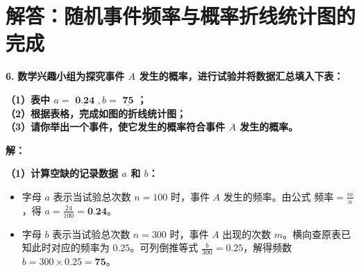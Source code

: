 \section{解答：随机事件频率与概率折线统计图的完成}

\vspace{0.6cm}

\textbf{\LARGE 6.} \textbf{数学兴趣小组为探究事件 $A$ 发生的概率，进行试验并将数据汇总填入下表：}

\vspace{0.3cm}
\begin{center}
\renewcommand{\arraystretch}{1.8}
\end{center}

\vspace{0.4cm}
\textbf{（1）表中 $a = \underline{\textbf{  0.24  }}, b = \underline{\textbf{  75  }}$；\\
（2）根据表格，完成如图的折线统计图；\\
（3）请你举出一个事件，使它发生的概率符合事件 $A$ 发生的概率。}

\vspace{0.4cm}
\textbf{解：}

\textbf{（1）计算空缺的记录数据 $a$ 和 $b$：}
\begin{itemize}
    \item 字母 $a$ 表示当试验总次数 $n=100$ 时，事件 $A$ 发生的频率。由公式 $\text{频率} = \frac{m}{n}$，得 $a = \frac{24}{100} = \textbf{0.24}$。
    \item 字母 $b$ 表示当试验总次数 $n=300$ 时，事件 $A$ 出现的次数 $m$。横向查原表已知此时对应的频率为 $0.25$。可列倒推等式 $\frac{b}{300} = 0.25$，解得频数 $b = 300 \times 0.25 = \textbf{75}$。
\end{itemize}

